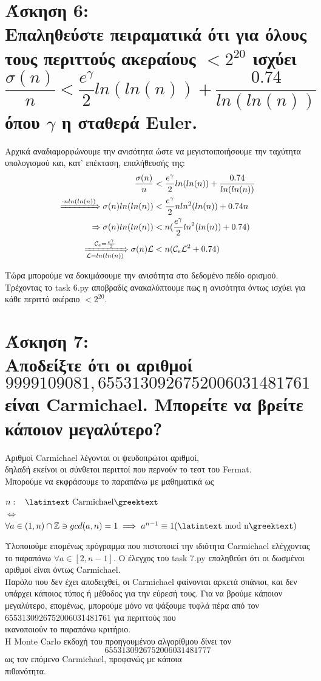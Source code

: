 \documentclass{article}
\newcommand{\blank}[1]{\hspace*{#1}}
\newcommand{\myspace}{\blank{0.3cm}}
\newcommand{\lt}[1]{\latintext #1\greektext}
\newcommand{\task}[2]{\newpage\section*{Άσκηση #1:\\#2}}
\begin{document}
\task{6}{
    Επαληθεύστε πειραματικά ότι για όλους τους περιττούς ακεραίους $< 2^{20}$ ισχύει \[\frac{\sigma(n)}{n} < \frac{e^\gamma}{2}ln(ln(n)) + \frac{0.74}{ln(ln(n))}\]
    όπου $\gamma$ η σταθερά \lt{Euler}.
}
{
    Αρχικά αναδιαμορφώνουμε την ανισότητα ώστε να μεγιστοιποιήσουμε την ταχύτητα υπολογισμού και, κατ' επέκταση, επαλήθευσής της:
    \begin{align*}
        \frac{\sigma(n)}{n} &< \frac{e^\gamma}{2}ln(ln(n)) + \frac{0.74}{ln(ln(n))}\\
        \xRightarrow{\cdot nln(ln(n))} \sigma(n)ln(ln(n)) &< \frac{e^\gamma}{2}nln^2(ln(n)) + 0.74n\\
        \Rightarrow \sigma(n)ln(ln(n)) &< n(\frac{e^\gamma}{2}ln^2(ln(n)) + 0.74)\\
        \xRightarrow[\mathcal{L} = ln(ln(n))]{\mathcal{C}_e = \frac{e^\gamma}{2}} \sigma(n)\mathcal{L} &< n(\mathcal{C}_e\mathcal{L}^2 + 0.74)
    \end{align*}
    
    Τώρα μπορούμε να δοκιμάσουμε την ανισότητα στο δεδομένο πεδίο ορισμού. Τρέχοντας το \lt{task 6.py} αποβραδίς ανακαλύπτουμε πως η ανισότητα όντως ισχύει για κάθε περιττό ακέραιο $<2^{20}$. 
}

\task{7}{
    Αποδείξτε ότι οι αριθμοί
    \[9999109081, 6553130926752006031481761 \]
    είναι \lt{Carmichael}. Μπορείτε να βρείτε κάποιον μεγαλύτερο?
}
{
    Αριθμοί \lt{Carmichael} λέγονται οι ψευδοπρώτοι αριθμοί,\\ δηλαδή εκείνοι οι σύνθετοι περιττοί που περνούν το τεστ του \lt{Fermat}.\\
    Μπορούμε να εκφράσουμε το παραπάνω με μαθηματικά ως
    \begin{center}
        $n: \myspace \text{\lt{Carmichael}}$\\
        $\iff$\\
        $\forall a\in(1, n)\cap\mathbb{Z} \ni gcd(a, n) = 1 \implies a^{n-1} \equiv 1 (\text{\lt{mod n}})$
    \end{center}
    
    Υλοποιούμε επομένως πρόγραμμα που πιστοποιεί την ιδιότητα \lt{Carmichael} ελέγχοντας το παραπάνω $\forall a\in[2, n - 1]$.
    Ο έλεγχος του \lt{task 7.py} επαληθεύει ότι οι δωσμένοι αριθμοί είναι όντως
    \lt{Carmichael}. \\
    
    Παρόλο που δεν έχει αποδειχθεί, οι \lt{Carmichael} φαίνονται αρκετά σπάνιοι, και δεν υπάρχει κάποιος τύπος ή μέθοδος για την εύρεσή τους. Για να βρούμε κάποιον μεγαλύτερο, επομένως, μπορούμε μόνο να ψάξουμε τυφλά πέρα από τον
    6553130926752006031481761 για περιττούς που\\ ικανοποιούν το παραπάνω κριτήριο.\\
    Η \lt{Monte Carlo} εκδοχή του προηγουμένου αλγορίθμου δίνει τον
    \[6553130926752006031481777\]
    ως τον επόμενο \lt{Carmichael}, προφανώς με κάποια\\ πιθανότητα.
}
\end{document}
